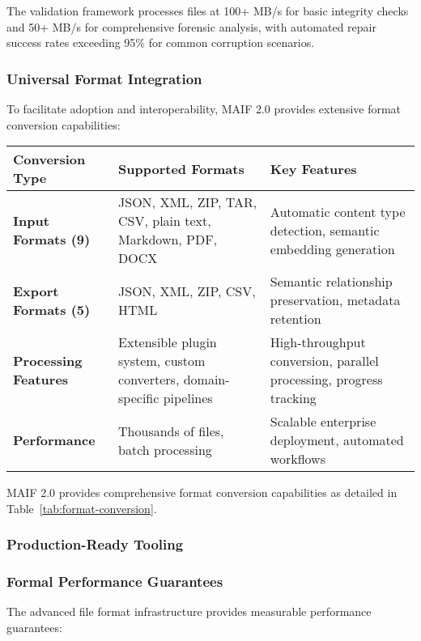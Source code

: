 \documentclass[conference]{IEEEtran}
\begin{document}
The validation framework processes files at 100+ MB/s for basic integrity checks and 50+ MB/s for comprehensive forensic analysis, with automated repair success rates exceeding 95\% for common corruption scenarios.

\subsubsection{Universal Format Integration}

To facilitate adoption and interoperability, MAIF 2.0 provides extensive format conversion capabilities:

\begin{table*}[!t]
\renewcommand{\arraystretch}{1.3}
\caption{MAIF Universal Format Conversion Capabilities}
\label{tab:format-conversion}
\centering
\footnotesize
\begin{tabular}{p{3cm}p{5cm}p{5cm}}
\toprule
\textbf{Conversion Type} & \textbf{Supported Formats} & \textbf{Key Features} \\
\midrule
\textbf{Input Formats (9)} & JSON, XML, ZIP, TAR, CSV, plain text, Markdown, PDF, DOCX & Automatic content type detection, semantic embedding generation \\
\textbf{Export Formats (5)} & JSON, XML, ZIP, CSV, HTML & Semantic relationship preservation, metadata retention \\
\textbf{Processing Features} & Extensible plugin system, custom converters, domain-specific pipelines & High-throughput conversion, parallel processing, progress tracking \\
\textbf{Performance} & Thousands of files, batch processing & Scalable enterprise deployment, automated workflows \\
\bottomrule
\end{tabular}
\end{table*}

MAIF 2.0 provides comprehensive format conversion capabilities as detailed in Table~\ref{tab:format-conversion}.

\subsubsection{Production-Ready Tooling}


\subsubsection{Formal Performance Guarantees}

The advanced file format infrastructure provides measurable performance guarantees:
\end{document}
